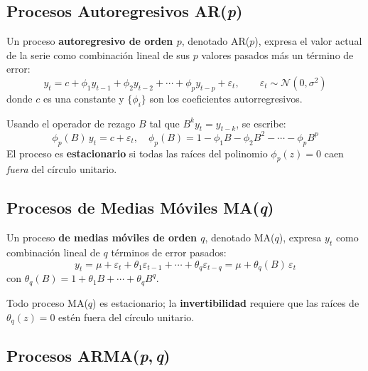 \documentclass[12pt,a4paper]{article}
\begin{document}
\subsection{Procesos Autoregresivos AR(\textit{p})}

\begin{defbox}
Un proceso \textbf{autoregresivo de orden $p$}, denotado AR($p$), expresa el valor
actual de la serie como combinaci\'{o}n lineal de sus $p$ valores pasados m\'{a}s un
t\'{e}rmino de error:
\begin{equation}
  y_t = c + \phi_1 y_{t-1} + \phi_2 y_{t-2} + \cdots + \phi_p y_{t-p} + \varepsilon_t,
  \qquad \varepsilon_t \sim \mathcal{N}(0,\sigma^2)
\end{equation}
donde $c$ es una constante y $\{\phi_i\}$ son los coeficientes autorregresivos.
\end{defbox}

\noindent
Usando el operador de rezago $B$ tal que $B^k y_t = y_{t-k}$, se escribe:
\begin{equation}
  \phi_p(B)\,y_t = c + \varepsilon_t, \quad
  \phi_p(B) = 1 - \phi_1 B - \phi_2 B^2 - \cdots - \phi_p B^p
\end{equation}
El proceso es \textbf{estacionario} si todas las ra\'ices del polinomio
$\phi_p(z)=0$ caen \emph{fuera} del c\'irculo unitario.

\subsection{Procesos de Medias M\'{o}viles MA(\textit{q})}

\begin{defbox}
Un proceso \textbf{de medias m\'{o}viles de orden $q$}, denotado MA($q$), expresa
$y_t$ como combinaci\'{o}n lineal de $q$ t\'{e}rminos de error pasados:
\begin{equation}
  y_t = \mu + \varepsilon_t + \theta_1\varepsilon_{t-1} + \cdots + \theta_q\varepsilon_{t-q}
  = \mu + \theta_q(B)\,\varepsilon_t
\end{equation}
con $\theta_q(B) = 1 + \theta_1 B + \cdots + \theta_q B^q$.
\end{defbox}

Todo proceso MA($q$) es estacionario; la \textbf{invertibilidad} requiere que las
ra\'ices de $\theta_q(z)=0$ est\'{e}n fuera del c\'irculo unitario.

\subsection{Procesos ARMA(\textit{p},\,\textit{q})}
\end{document}
